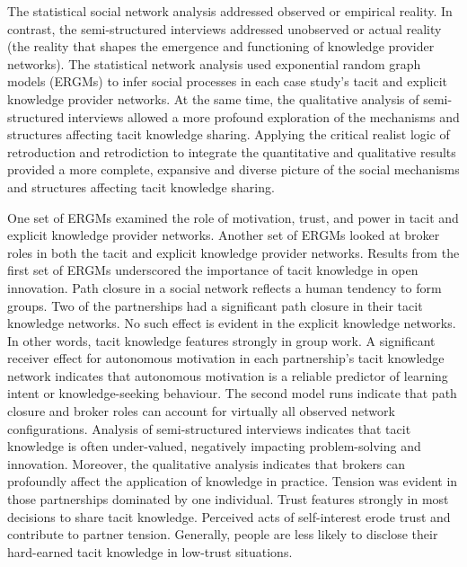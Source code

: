 \documentclass[12pt,table,xcdraw]{book}
\begin{document}
The statistical social network analysis addressed observed or empirical reality. In contrast, the semi-structured interviews addressed unobserved or actual reality (the reality that shapes the emergence and functioning of knowledge provider networks). The statistical network analysis used exponential random graph models (ERGMs) to infer social processes in each case study's tacit and explicit knowledge provider networks. At the same time, the qualitative analysis of semi-structured interviews allowed a more profound exploration of the mechanisms and structures affecting tacit knowledge sharing. Applying the critical realist logic of retroduction and retrodiction to integrate the quantitative and qualitative results provided a more complete, expansive and diverse picture of the social mechanisms and structures affecting tacit knowledge sharing. \medskip

One set of ERGMs examined the role of motivation, trust, and power in tacit and explicit knowledge provider networks. Another set of ERGMs looked at broker roles in both the tacit and explicit knowledge provider networks. Results from the first set of ERGMs underscored the importance of tacit knowledge in open innovation. Path closure in a social network reflects a human tendency to form groups. Two of the partnerships had a significant path closure in their tacit knowledge networks. No such effect is evident in the explicit knowledge networks. In other words, tacit knowledge features strongly in group work. A significant receiver effect for autonomous motivation in each partnership's tacit knowledge network indicates that autonomous motivation is a reliable predictor of learning intent or knowledge-seeking behaviour. The second model runs indicate that path closure and broker roles can account for virtually all observed network configurations. Analysis of semi-structured interviews indicates that tacit knowledge is often under-valued, negatively impacting problem-solving and innovation. Moreover, the qualitative analysis indicates that brokers can profoundly affect the application of knowledge in practice. Tension was evident in those partnerships dominated by one individual. Trust features strongly in most decisions to share tacit knowledge. Perceived acts of self-interest erode trust and contribute to partner tension. Generally, people are less likely to disclose their hard-earned tacit knowledge in low-trust situations. \medskip
\end{document}
